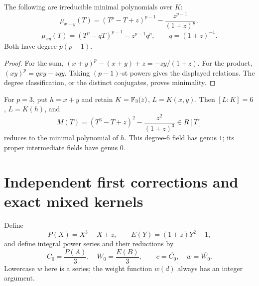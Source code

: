 \begin{corollary}\label{cor:minmodp}
The following are irreducible minimal polynomials over $K$:
\[
 \mu_{x+y}(T)=(T^p-T+z)^{p-1}-\frac{z^{p-1}}{(1+z)^p},
\]
\[
 \mu_{xy}(T)=(T^p-qT)^{p-1}-z^{p-1}q^p,
 \qquad q=(1+z)^{-1}.
\]
Both have degree $p(p-1)$.
\end{corollary}
\begin{proof}
For the sum, $(x+y)^p-(x+y)+z=-zy/(1+z)$.
For the product, $(xy)^p=qxy-zqy$.
Taking $(p-1)$-st powers gives the displayed relations.
The degree classification, or the distinct conjugates, proves minimality.
\end{proof}

For $p=3$, put $h=x+y$ and retain $K=\mathbb F_3(z)$, $L=K(x,y)$.
Then $[L:K]=6$, $L=K(h)$, and
\begin{equation}\label{eq:M}
 M(T)=(T^3-T+z)^2-\frac{z^2}{(1+z)^3}\in R[T]
\end{equation}
reduces to the minimal polynomial of $h$. This degree-$6$ field has
genus $1$; its proper intermediate fields have genus $0$.

\section{Independent first corrections and exact mixed kernels}
\label{sec:kernel}

Define
\begin{equation}\label{eq:PE}
 P(X)=X^3-X+z,\qquad E(Y)=(1+z)Y^2-1,
\end{equation}
and define integral power series and their reductions by
\[
 C_0=\frac{P(A)}3,\quad W_0=\frac{E(B)}3,
 \qquad c=\overline{C_0},\quad w=\overline{W_0}.
\]
Lowercase $w$ here is a series; the weight function $w(d)$ always has an
integer argument.

